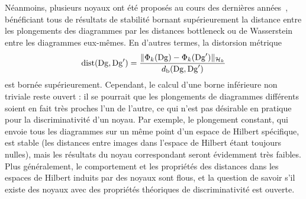 
N\'eanmoins, plusieurs noyaux ont \'et\'e propos\'es au cours des derni\`eres ann\'ees~\cite{Adams17,Bubenik15,Kusano16,Reininghaus15}, 
b\'en\'eficiant tous de r\'esultats de stabilit\'e bornant sup\'erieurement la distance entre les plongements des diagrammes par les distances
bottleneck ou de Wasserstein entre les diagrammes eux-m\^emes. En d'autres termes, la distorsion m\'etrique 
$${\rm dist}(\mathrm{Dg},\mathrm{Dg}')=\frac{\|\Phi_k(\mathrm{Dg})-\Phi_k(\mathrm{Dg}')\|_{\mathcal H_k}}{d_{\rm b}(\mathrm{Dg},\mathrm{Dg}')}$$
est born\'ee sup\'erieurement.
Cependant, le calcul d'une borne inf\'erieure non triviale reste ouvert : il se pourrait que les plongements de diagrammes diff\'erents soient 
en fait tr\`es proches l'un de l'autre, ce qui n'est pas d\'esirable en pratique pour la discriminativit\'e d'un noyau.
Par exemple, le plongement constant, qui envoie tous les diagrammes sur un m\^eme point d'un espace de Hilbert sp\'ecifique,
est stable (les distances entre images dans l'espace de Hilbert \'etant toujours nulles), mais les 
r\'esultats du noyau correspondant seront \'evidemment tr\`es faibles.   
Plus g\'en\'eralement, le comportement et les propri\'et\'es des distances dans les espaces de Hilbert induits par des noyaux sont flous,
et la question de savoir s'il existe des noyaux avec des propri\'et\'es th\'eoriques de discriminativit\'e est ouverte. 

